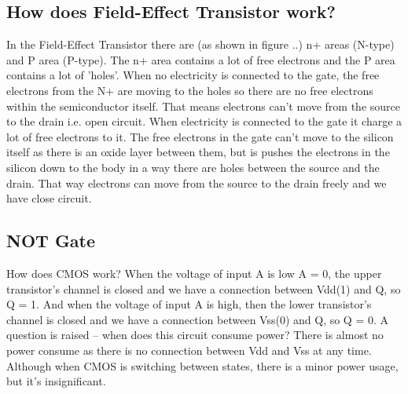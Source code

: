 \subsection{ How does Field-Effect Transistor work? }
In the Field-Effect Transistor there are (as shown in figure ..) n+ areas (N-type) and P area (P-type). The n+ area contains a lot of free electrons and the P area contains a lot of 'holes'. When no electricity is connected to the gate, the free electrons from the N+ are moving to the holes so there are no free electrons within the semiconductor itself. That means electrons can't move from the source to the drain i.e. open circuit. When electricity is connected to the gate it charge a lot of free electrons to it. The free electrons in the gate can't move to the silicon itself as there is an oxide layer between them, but is pushes the electrons in the silicon down to the body in a way there are holes between the source and the drain. That way electrons can move from the source to the drain freely and we have close circuit. 
\subsection{ NOT Gate }
How does CMOS work? When the voltage of input A is low A = 0, the upper transistor's channel is closed and we have a connection between Vdd(1) and Q, so Q = 1. And when the voltage of input A is high, then the lower transistor's channel is closed and we have a connection between Vss(0) and Q, so Q = 0.
A question is raised – when does this circuit consume power? There is almost no power consume as there is no connection between Vdd and Vss at any time. Although when CMOS is switching between states, there is a minor power usage, but it's insignificant.

